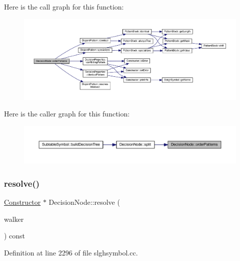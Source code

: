 Here is the call graph for this function\+:
\nopagebreak
\begin{figure}[H]
\begin{center}
\leavevmode
\includegraphics[width=350pt]{class_decision_node_aa1e03428a03681b6a89d812ec4f7346d_cgraph}
\end{center}
\end{figure}
Here is the caller graph for this function\+:
\nopagebreak
\begin{figure}[H]
\begin{center}
\leavevmode
\includegraphics[width=350pt]{class_decision_node_aa1e03428a03681b6a89d812ec4f7346d_icgraph}
\end{center}
\end{figure}
\mbox{\label{class_decision_node_af8bd0d3c14c10f9b43881f1ef493f95a}} 
\subsubsection{\texorpdfstring{resolve()}{resolve()}}
{\footnotesize\ttfamily \mbox{\hyperlink{class_constructor}{Constructor}} $\ast$ Decision\+Node\+::resolve (\begin{DoxyParamCaption}\item[{\mbox{\hyperlink{class_parser_walker}{Parser\+Walker}} \&}]{walker }\end{DoxyParamCaption}) const}



Definition at line 2296 of file slghsymbol.\+cc.

